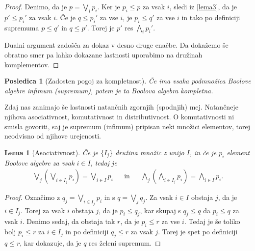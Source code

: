 \documentclass{amsart}
\newtheorem{lema}[izrek]{Lema}
\newtheorem{posledica}[izrek]{Posledica}
\begin{document}
\begin{proof}
    Denimo, da je \(p = \bigvee_{i} p_i\). Ker je \(p_i \leq p\) za vsak $i$, sledi iz \ref{lema3}, da je \(p' \leq p_i'\) za vsak $i$.
    Če je \(q \leq p_i'\) za vse $i$, je \(p_i \leq q'\) za vse $i$ in tako po definiciji supremuma \(p \leq q'\) in \(q \leq p'\). 
    Torej je $p'$ res \(\bigwedge_{i} p_i'\).

    Dualni argument zadošča za dokaz v desno druge enačbe. Da dokažemo še obratno smer pa lahko dokazane lastnosti uporabimo na družinah komplementov.

\end{proof}

\begin{posledica}[Zadosten pogoj za kompletnost]
    Če ima vsaka podmnožica Boolove algebre infimum (supremum), potem je ta Boolova algebra kompletna.
\end{posledica}

    

Zdaj nas zanimajo še lastnosti natančnih zgornjih (spodnjih) mej. Natančneje njihova asociativnost, komutativnost
in distributivnost. O komutativnosti ni smisla govoriti, saj je supremum (infimum) pripisan neki množici elementov, torej neodvisno od njihove urejenosti.

\begin{lema}[Asociativnost]
    Če je \(\{I_j\}\) družina množic z unijo \(I\), in če je \(p_i\) element Boolove algebre za vsak \(i \in I\), tedaj je
    \begin{align*}
        \bigvee_{j}\left(\bigvee_{i \in I_j} p_i\right) = \bigvee_{i \in I} p_i && \text{in} && \bigwedge_{j}\left(\bigwedge_{i \in I_j} p_i\right) = \bigwedge_{i \in I} p_i.
    \end{align*}
\end{lema}

\begin{proof}
    Označimo z \(q_j = \bigvee_{i \in I_j} p_i\) in s \(q = \bigvee_j q_j\).
    Za vsak \(i \in I\) obstaja \(j\), da je \(i \in I_j\). Torej za vsak \(i\)
    obstaja \(j\), da je \(p_i \leq q_j\), kar skupaj s \(q_j \leq q\) da \(p_i \leq q\) za vsak \(i\).
    Denimo sedaj, da obstaja tak \(r\), da je \(p_i \leq r\) za vse \(i\). Tedaj je še toliko bolj
    \(p_i \leq r\) za \(i \in I_j\) in po definiciji \(q_j \leq r\) za vsak \(j\).
    Torej je spet po definiciji \(q \leq r\), kar dokazuje, da je \(q\) res želeni supremum.

\end{proof}
\end{document}
